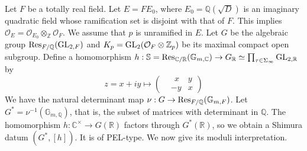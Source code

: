 \documentclass{article}
\begin{document}
Let $F$ be a totally real field. Let $E=FE_0$, where $E_0=\mathbb{Q}(\sqrt{D})$ is an imaginary quadratic field whose ramification set is disjoint with that of $F$. This implies $\mathcal{O}_E=\mathcal{O}_{E_0}\otimes_{\mathbb{Z}}\mathcal{O}_F$. We assume that $p$ is unramified in $E$. Let $G$ be the algebraic group $\textnormal{Res}_{F/\mathbb{Q}}(\textnormal{GL}_{2,F})$ and $K_p=\textnormal{GL}_{2}(\mathcal{O}_F\otimes \mathbb{Z}_p)$ be its maximal compact open subgroup. Define a homomorphism $h:\mathbb{S}=\textnormal{Res}_{\mathbb{C}/\mathbb{R}}(\mathbb{G}_{m,\mathbb{C}})\to G_{\mathbb{R}}\simeq \prod_{\tau\in\Sigma_{\infty
}}\textnormal{GL}_{2,\mathbb{R}}$ by
\begin{equation}
	z=x+iy\longmapsto \left( 
	\begin{aligned}
		&\ \  x &y\\
		&-y &x
	\end{aligned}\right)
\end{equation}
We have the natural determinant map $\nu:G\to \textnormal{Res}_{F/\mathbb{Q}}(\mathbb{G}_{m,F})$. Let $G^\ast=\nu^{-1}(\mathbb{G}_{m,\mathbb{Q}})$, that is, the subset of matrices with determinant in $\mathbb{Q}$. The homomorphism $h:\mathbb{C}^\times\rightarrow G(\mathbb{R})$ factors through $G^\ast(\mathbb{R})$, so we obtain a Shimura datum $(G^\ast,[h])$. It is of PEL-type. We now give its moduli interpretation.
\end{document}
